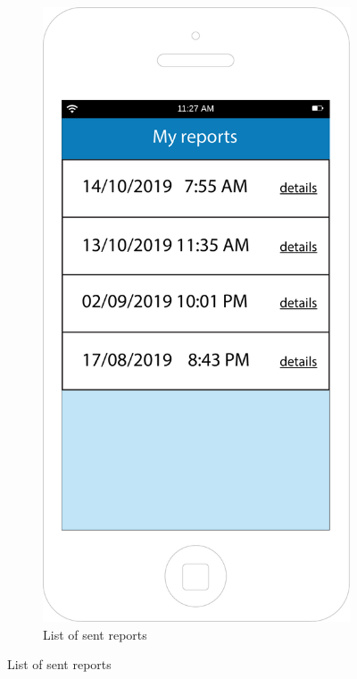 \documentclass[12pt,a4paper]{report}
\begin{document}
		\begin{figure}
		\begin{subfigure}{0.5\textwidth}
		\setcounter{subfigure}{2}
			\includegraphics[scale=0.25, center]{Myreports}
			\caption{List of sent reports}
			\label{List of sent reports}

\end{subfigure}
\end{figure}
\end{document}
